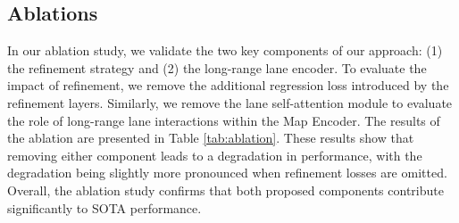 \subsection{Ablations}\label{subsection:ablations}
In our ablation study, we validate the two key components of our approach: (1) the refinement strategy and (2) the long-range lane encoder. To evaluate the impact of refinement, we remove the additional regression loss introduced by the refinement layers. Similarly, we remove the lane self-attention module to evaluate the role of long-range lane interactions within the Map Encoder. The results of the ablation are presented in Table \ref{tab:ablation}. These results show that removing either component leads to a degradation in performance, with the degradation being slightly more pronounced when refinement losses are omitted. Overall, the ablation study confirms that both proposed components contribute significantly to SOTA performance.

\begin{table}[h]
    \centering
    \caption{Ablation Study conducted on the nuScenes val split}
    \label{tab:ablation}
\end{table}